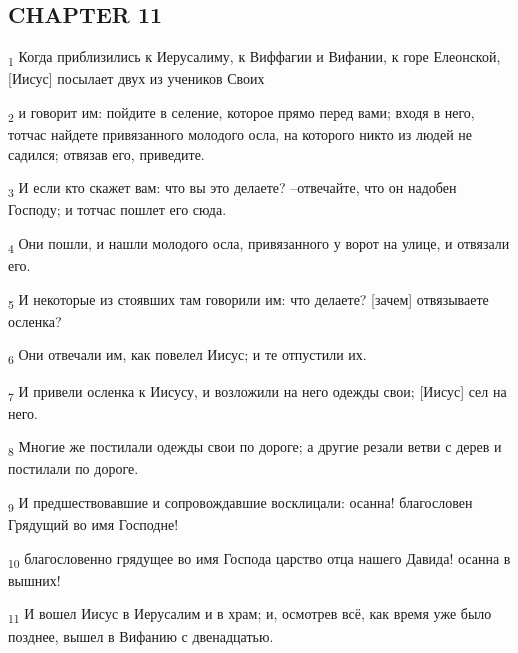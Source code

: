 \subsection{CHAPTER 11}
\begin{tcolorbox}
\textsubscript{1} Когда приблизились к Иерусалиму, к Виффагии и Вифании, к горе Елеонской, [Иисус] посылает двух из учеников Своих
\end{tcolorbox}
\begin{tcolorbox}
\textsubscript{2} и говорит им: пойдите в селение, которое прямо перед вами; входя в него, тотчас найдете привязанного молодого осла, на которого никто из людей не садился; отвязав его, приведите.
\end{tcolorbox}
\begin{tcolorbox}
\textsubscript{3} И если кто скажет вам: что вы это делаете? --отвечайте, что он надобен Господу; и тотчас пошлет его сюда.
\end{tcolorbox}
\begin{tcolorbox}
\textsubscript{4} Они пошли, и нашли молодого осла, привязанного у ворот на улице, и отвязали его.
\end{tcolorbox}
\begin{tcolorbox}
\textsubscript{5} И некоторые из стоявших там говорили им: что делаете? [зачем] отвязываете осленка?
\end{tcolorbox}
\begin{tcolorbox}
\textsubscript{6} Они отвечали им, как повелел Иисус; и те отпустили их.
\end{tcolorbox}
\begin{tcolorbox}
\textsubscript{7} И привели осленка к Иисусу, и возложили на него одежды свои; [Иисус] сел на него.
\end{tcolorbox}
\begin{tcolorbox}
\textsubscript{8} Многие же постилали одежды свои по дороге; а другие резали ветви с дерев и постилали по дороге.
\end{tcolorbox}
\begin{tcolorbox}
\textsubscript{9} И предшествовавшие и сопровождавшие восклицали: осанна! благословен Грядущий во имя Господне!
\end{tcolorbox}
\begin{tcolorbox}
\textsubscript{10} благословенно грядущее во имя Господа царство отца нашего Давида! осанна в вышних!
\end{tcolorbox}
\begin{tcolorbox}
\textsubscript{11} И вошел Иисус в Иерусалим и в храм; и, осмотрев всё, как время уже было позднее, вышел в Вифанию с двенадцатью.
\end{tcolorbox}
